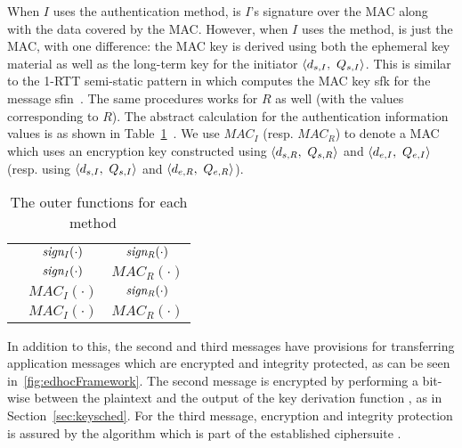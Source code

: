 When $I$ uses the \mSig{} authentication method, \mAuthi{} is $I$'s signature
over the MAC along with the data covered by the MAC.
%
However, when $I$ uses the \mStat{} method, \mAuthi{} is just the MAC, with
one difference: the MAC key is derived using both the ephemeral key material
\mGxy{} as well as the long-term key for the initiator
$\langle\mPriv{I},\ \mPub{I}\rangle$.
%
This is similar to the 1-RTT semi-static pattern in \mOptls{} which computes the
MAC key \textsf{sfk} for the message
\textsf{sfin}~\cite{DBLP:conf/eurosp/KrawczykW16}.
%
The same procedures works for $R$ as well (with the values corresponding to 
$R$).
%
The abstract calculation for the authentication information values is as shown
in Table~\ref{tab:authvalues}~\cite{Norr21}.
%
We use $\mathit{MAC}_{I}$ (resp. $\mathit{MAC}_{R}$) to denote a MAC 
which uses
an encryption key constructed using
$\langle d_{s,R},\ Q_{s,R}\rangle$ and $\langle d_{e,I},\ Q_{e,I}\rangle$
(resp. using $\langle\mPriv{I},\ \mPub{I}\rangle$ and $\langle\mY,\ 
\mGy\rangle$).
%
\begin{table}[ht]
\centering
\begin{tabular}{|c|c|c|}
        \hline
        \mMethod & \mAuthi & \mAuthr\\
        \hline
        \mSigSig{} & $\mathit{sign_{I}}(\cdot)$ & $\mathit{sign_{R}}(\cdot)$ \\
        \mSigStat{} & $\mathit{sign_{I}}(\cdot)$ & $\textit{MAC}_R(\cdot)$\\
        \mStatSig{} & $\textit{MAC}_I(\cdot)$ & $\mathit{sign_{R}}(\cdot)$\\
        \mStatStat{} & $\textit{MAC}_I(\cdot)$ & $\textit{MAC}_R(\cdot)$\\
        \hline
\end{tabular}
\caption{The outer functions for each method \mMethod{}~\cite{Norr21}}
\label{tab:authvalues}
\end{table}
%

In addition to this, the second and third messages have
provisions for transferring application messages which are encrypted and
integrity protected, as can be seen in~\ref{fig:edhocFramework}.
%
The second message is encrypted by performing a bit-wise \mXor{} between
the plaintext and the output of the key derivation function \mHkdf{}, as
in Section~\ref{sec:keysched}.
%
For the third message, encryption and integrity protection is assured by the
\mAead{} algorithm which is part of the established ciphersuite \mSuites{}.
%

